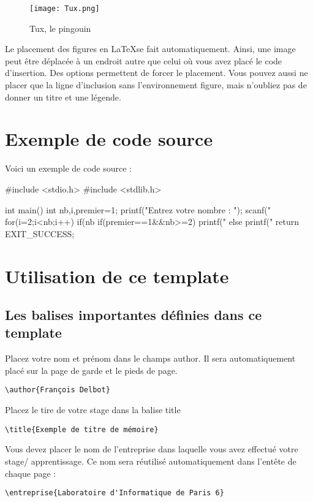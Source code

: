 \documentclass[a4paper, 12pt, twoside]{report}
\begin{document}
\begin{figure}[h]
\centering
\texttt{[image: Tux.png]}
\caption{Tux, le pingouin}
\label{Tux}
\end{figure}
Le placement des figures en \LaTeX se fait automatiquement. Ainsi, une image peut être déplacée à un endroit autre que celui où vous avez placé le code d'insertion. Des options permettent de forcer le placement. Vous pouvez aussi ne placer que la ligne d'inclusion sans l'environnement figure, mais n'oubliez pas de donner un titre et une légende.$\ $\\$\ $\\
\section{Exemple de code source}
Voici un exemple de code source :
\begin{codeC}
	#include <stdio.h>
	#include <stdlib.h>
	
	int main()
	{
		int nb,i,premier=1;
		printf("Entrez votre nombre : ");
		scanf("%
		for(i=2;i<nb;i++)
		{
			if(nb%
		}
		if(premier==1&&nb>=2)
		{
			printf("%
		}
		else
		{
			printf("%
		}
		return EXIT_SUCCESS;
	}
\end{codeC}	


\section{Utilisation de ce template}


\subsection{Les balises importantes définies dans ce template}
Placez votre nom et prénom dans le champs author. Il sera automatiquement placé sur la page de garde et le pieds de page.
\begin{verbatim}
\author{François Delbot}
\end{verbatim}

Placez le tire de votre stage dans la balise title
\begin{verbatim}
\title{Exemple de titre de mémoire}
\end{verbatim}

Vous devez placer le nom de l'entreprise dans laquelle vous avez effectué votre stage/ apprentissage. Ce nom sera réutilisé automatiquement dans l'entête de chaque page :
\begin{verbatim}
\entreprise{Laboratoire d'Informatique de Paris 6}
\end{verbatim}
\end{document}
